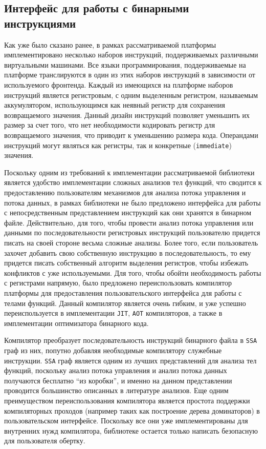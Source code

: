 \subsection{Интерфейс для работы с бинарными инструкциями}

Как уже было сказано ранее, в рамках рассматриваемой платформы имплементировано несколько наборов инструкций, поддерживаемых различными виртуальными машинами. Все языки программирования, поддерживаемые на платформе транслируются в один из этих наборов инструкций в зависимости от используемого фронтенда. Каждый из имеющихся на платформе наборов инструкций является регистровым, с одним выделенным регистром, называемым аккумулятором, использующимся как неявный регистр для сохранения возвращаемого значения. Данный дизайн инструкций позволяет уменьшить их размер за счет того, что нет необходимости кодировать регистр для возвращаемого значения, что приводит к уменьшению размера кода. Операндами инструкций могут являться как регистры, так и конкретные (\texttt{immediate}) значения.

Поскольку одним из требований к имплементации рассматриваемой библиотеки является удобство имплементации сложных анализов тел функций, что сводится к предоставлению пользователям механизмов для анализа потока управления и потока данных, в рамках библиотеки не было предложено интерфейса для работы с непосредственным представлением инструкций как они хранятся в бинарном файле. Действительно, для того, чтобы провести анализ потока управления или данными по последовательности регистровых инструкций пользователю придется писать на своей стороне весьма сложные анализы. Более того, если пользователь захочет добавить свою собственную инструкцию в последовательность, то ему придется писать собственный алгоритм выделения регистров, чтобы избежать конфликтов с уже используемыми. Для того, чтобы обойти необходимость работы с регистрами напрямую, было предложено переиспользовать компилятор платформы для предоставления пользовательского интерфейса для работы с телами функций. Данный компилятор является очень гибким, и уже успешно переиспользуется в имплементации \texttt{JIT}, \texttt{AOT} компиляторов, а также в имплементации оптимизатора бинарного кода.

Компилятор преобразует последовательность инструкций бинарного файла в \texttt{SSA} граф из них, попутно добавляя необходимые компилятору служебные инструкции. \texttt{SSA} граф является одним из лучших представлений для анализа тел функций, поскольку анализ потока управления и анализ потока данных получаются бесплатно ``из коробки'', и именно на данном представлении проводится большинство описанных в литературе анализов. Еще одним преимуществом переиспользования компилятора является простота поддержки компиляторных проходов (например таких как построение дерева доминаторов) в пользовательском интерфейсе. Поскольку все они уже имплементированы для внутренних нужд компилятора, библиотеке остается только написать безопасную для пользователя обертку.

